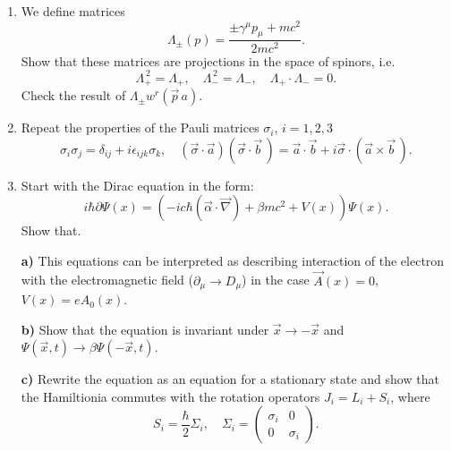 \documentclass[a4paper,11pt]{article}
\begin{document}
\begin{enumerate}
\item We define matrices
  \begin{equation}
    \label{QM:17}
    \Lambda_{ \pm }( p )
    = \frac{ \pm\gamma^{ \mu } p_{ \mu } + m c^{ 2 } }{ 2 m c^{ 2 } }.
  \end{equation}
  Show that these matrices are projections in the space of spinors,
  i.e.
  \begin{equation}
    \label{QM:18}
    \Lambda_{ + }^{ \, 2 } = \Lambda_{ + }, \quad
    \Lambda_{ - }^{ \, 2 } = \Lambda_{ - }, \quad
    \Lambda_{ + } \cdot \Lambda_{ - } = 0.
  \end{equation}
  Check the result of $\Lambda_{ \pm } w^{ r }( \vec{ p } \,a )$.



\item Repeat the properties of the Pauli matrices $\sigma_{ i }$,
  $i = 1, 2, 3$
  \begin{equation}
    \label{QM:19}
    \sigma_{ i } \sigma_{ j } = \delta_{ i j } + i \epsilon_{ i j k } \sigma_{ k }, \quad
    \left( \vec{ \sigma } \cdot \vec{ a } \right)
    \left( \vec{ \sigma } \cdot \vec{ b } \, \right)
    =
    \vec{ a } \cdot \vec{ b }
    + i \vec{ \sigma } \cdot \left( \vec{ a } \times \vec{ b } \, \right).
  \end{equation}



\item Start with the Dirac equation in the form:
  \begin{equation}
    \label{QM:20}
    i \hbar \partial \Psi( x )
    =
    \left( -ic\hbar \left( \vec{ \alpha } \cdot \vec{ \nabla } \right)
      + \beta m c^{ 2 } + V( x ) \right) \Psi( x ).
  \end{equation}
  Show that.

  \textbf{a)} This equations can be interpreted as describing
  interaction of the electron with the electromagnetic field
  ($\partial_{ \mu } \to D_{ \mu }$) in the case $\vec{ A }( x ) = 0$,
  $V( x ) = e A_{ 0 }( x )$.

  \textbf{b)} Show that the equation is invariant under
  $\vec{ x } \to -\vec{ x }$ and
  $\Psi( \vec{ x }, t ) \to \beta \Psi( -\vec{ x }, t )$.

  \textbf{c)} Rewrite the equation as an equation for a stationary
  state and show that the Hamiltionia commutes with the rotation
  operators $J_{ i } = L_{ i } + S_{ i }$, where
  \begin{equation}
    \label{QM:21}
    S_{ i } = \frac{ \hbar }{ 2 } \Sigma_{ i }, \quad
    \Sigma_{ i }
    =
    \begin{pmatrix}
      \sigma_{ i } & 0 \\
      0 & \sigma_{ i }
    \end{pmatrix}.
  \end{equation}


\end{enumerate}
\end{document}
